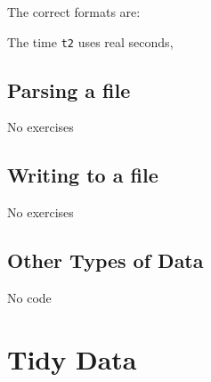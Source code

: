 \documentclass[]{book}
\newenvironment{Shaded}{\begin{snugshade}}{\end{snugshade}}
\newcommand{\CommentTok}[1]{\textcolor[rgb]{0.56,0.35,0.01}{\textit{#1}}}
\newcommand{\KeywordTok}[1]{\textcolor[rgb]{0.13,0.29,0.53}{\textbf{#1}}}
\newcommand{\NormalTok}[1]{#1}
\newcommand{\StringTok}[1]{\textcolor[rgb]{0.31,0.60,0.02}{#1}}
\theoremstyle{plain}
\theoremstyle{remark}
\begin{document}
The correct formats are:

\begin{Shaded}
\end{Shaded}

The time \texttt{t2} uses real seconds,

\begin{Shaded}
\end{Shaded}

\hypertarget{parsing-a-file}{%
\section{Parsing a file}\label{parsing-a-file}}

No exercises

\hypertarget{writing-to-a-file}{%
\section{Writing to a file}\label{writing-to-a-file}}

No exercises

\hypertarget{other-types-of-data}{%
\section{Other Types of Data}\label{other-types-of-data}}

No code

\hypertarget{tidy-data}{%
\chapter{Tidy Data}\label{tidy-data}}
\end{document}

